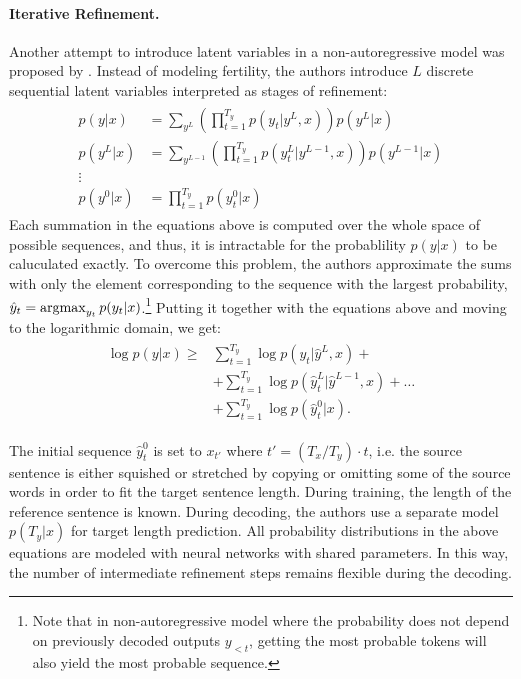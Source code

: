 \paragraph{Iterative Refinement.} Another attempt to introduce latent variables
in a non-autoregressive model was proposed by
\citet{lee-etal-2018-deterministic}.  Instead of modeling fertility, the
authors introduce $L$ discrete sequential latent variables interpreted as
stages of refinement:
%
\begin{align}
  \begin{split}
    p(y|x) & = \sum_{y^L}
      \left( \prod_{t=1}^{T_y} p(y_t|y^L, x) \right) p(y^L|x) \\
    p(y^L|x) & = \sum_{y^{L-1}}
      \left( \prod_{t=1}^{T_y} p(y_t^L | y^{L-1}, x) \right)
      p(y^{L-1}|x) \\
    \vdots \\
    p(y^0|x) & = \prod_{t=1}^{T_y} p(y_t^0|x)
  \end{split}
\end{align}
%
Each summation in the equations above is computed over the whole space of
possible sequences, and thus, it is intractable for the probablility $p(y|x)$
to be caluculated exactly. To overcome this problem, the authors approximate
the sums with only the element corresponding to the sequence with the largest
probability, $\hat{y}_t = \operatorname*{argmax}_{y_t}p(y_t|x)$.\footnote{Note that in
  non-autoregressive model where the probability does not depend on previously
  decoded outputs $y_{<t}$, getting the most probable tokens will also yield
  the most probable sequence.}  Putting it together with the equations above
and moving to the logarithmic domain, we get:
\begin{align}
  \begin{split}
    \log p(y|x) \geq
    & \sum_{t=1}^{T_y} \log p(y_t| \hat{y}^L, x) + \\
    & + \sum_{t=1}^{T_y} \log p(\hat{y}_t^{L}| \hat{y}^{L-1}, x) + \ldots \\
    & + \sum_{t=1}^{T_y} \log p(\hat{y}_t^0 | x). \label{eq:refinement-lowerbound}
  \end{split}
\end{align}

The initial sequence $\hat{y}_t^0$ is set to $x_{t'}$ where
$t' = (T_x / T_y) \cdot t$, i.e. the source sentence is either squished or
stretched by copying or omitting some of the source words in order to fit the
target sentence length. During training, the length of the reference sentence
is known. During decoding, the authors use a separate model $p(T_y|x)$ for
target length prediction. All probability distributions in the above equations
are modeled with neural networks with shared parameters. In this way, the
number of intermediate refinement steps remains flexible during the decoding.


